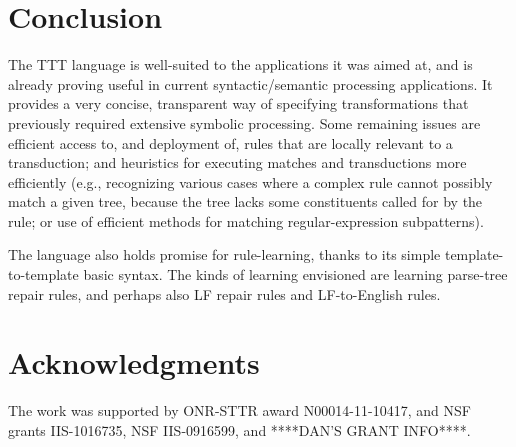 \documentclass[a4,11pt]{article}
\begin{document}
\section{Conclusion}
The TTT language is well-suited to the applications it was aimed at,
and is already proving useful in current syntactic/semantic
processing applications. It provides a very concise, transparent
way of specifying transformations that previously required
extensive symbolic processing. Some remaining issues are efficient access
to, and deployment of, rules that are locally relevant to a transduction; 
and heuristics for executing matches and transductions more efficiently (e.g.,
recognizing various cases where a complex rule cannot possibly match a
given tree, because the tree lacks some constituents called for by the
rule; or use of efficient methods for matching regular-expression subpatterns).

The language also holds promise for rule-learning, thanks to its simple 
template-to-template basic syntax. The kinds of learning envisioned
are learning parse-tree repair rules, and perhaps also LF repair
rules and LF-to-English rules.

\section*{Acknowledgments}
The work was supported by ONR-STTR award N00014-11-10417, and NSF grants IIS-1016735,  NSF IIS-0916599, and {****DAN'S GRANT INFO****}.
\end{document}
